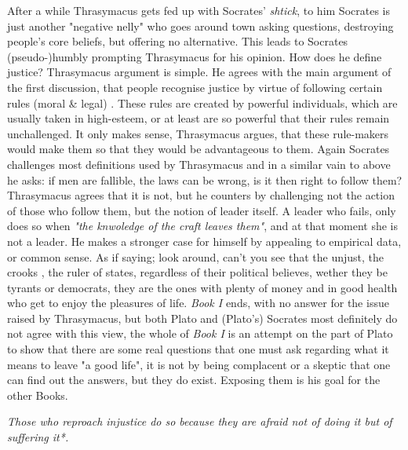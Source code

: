 \documentclass[english,course]{Notes}
\newcommand{\ita}[1]{\textit{#1}}
\newcommand\quo[1]{\begin{displayquote}\ita{\large{#1}}\end{displayquote}}
\begin{document}
\par{After a while Thrasymacus gets fed up with Socrates' \ita{shtick}, to him Socrates is just another "negative nelly" who goes around town asking questions, destroying people's core beliefs, but offering no alternative. This leads to Socrates (pseudo-)humbly prompting Thrasymacus for his opinion. How does he define justice? Thrasymacus argument is simple. He agrees with the main argument of the first discussion, that people recognise justice by virtue of following certain rules (moral \& legal) . These rules are created by powerful individuals, which are usually taken in high-esteem, or at least are so powerful that their rules remain unchallenged. It only makes sense, Thrasymacus argues, that these rule-makers would make them so that they would be advantageous to them. Again Socrates challenges most definitions used by Thrasymacus and in a similar vain to above he asks: if men are fallible, the laws can be wrong, is it then right to follow them? Thrasymacus agrees that it is not, but he counters by challenging not the action of those who follow them, but the notion of leader itself. A leader who fails, only does so when \ita{"the knwoledge of the craft leaves them"}, and at that moment she is not a leader. He makes a stronger case for himself by appealing to empirical data, or common sense. As if saying; look around,  can't you see that the unjust, the crooks , the ruler of states, regardless of their political believes, wether they be tyrants or democrats, they are the ones with plenty of money and in good health who get to enjoy the pleasures of life. \ita{Book I} ends, with no answer for the issue raised by Thrasymacus, but both Plato and (Plato's) Socrates most definitely do not agree with this view, the whole of \ita{Book I} is an attempt on the part of Plato to show that there are some real questions that one must ask regarding what it means to leave "a good life", it is not by being complacent or a skeptic that one can find out the answers, but they do exist. Exposing them is his goal for the other Books.}

\quo{Those who reproach injustice do so because they are afraid not of doing it but of suffering it*.}
\end{document}
